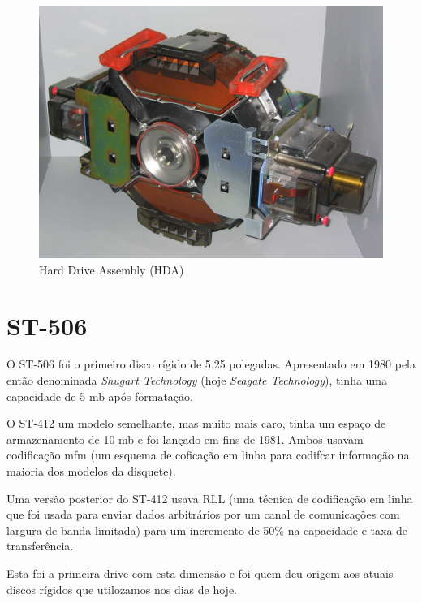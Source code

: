 \documentclass{report}
\begin{document}
	\begin{figure} [h]
		\centering
		\includegraphics[scale=0.07]{ibm3380.jpg}
		\caption{Hard Drive Assembly (HDA)}
	\end{figure}

\newpage
		
		\section{ST-506}

	O ST-506 foi o primeiro disco rígido de 5.25 polegadas. Apresentado em 1980 pela então denominada \textit{Shugart Technology} (hoje \textit{Seagate Technology}), tinha uma capacidade de 5 \ac{mb} após formatação. 
\vspace{1mm}

	O ST-412 um modelo semelhante, mas muito mais caro, tinha um espaço de armazenamento de 10 \ac{mb} e foi lançado em fins de 1981. Ambos usavam codificação \ac{mfm} (um esquema de coficação em linha para codifcar informação na maioria dos modelos da disquete).
\vspace{1mm}
	
	Uma versão posterior do ST-412 usava RLL (uma técnica de codificação em linha que foi usada para enviar dados arbitrários por um canal de comunicações com largura de banda limitada) para um incremento de 50\% na capacidade e taxa de transferência.
\vspace{1mm}
	
	Esta foi a primeira drive com esta dimensão e foi quem deu origem aos atuais discos rígidos que utilozamos nos dias de hoje.
\vspace{1mm}
\end{document}

